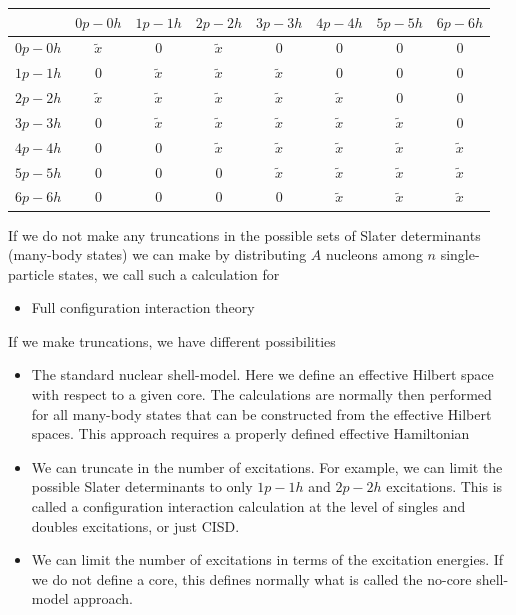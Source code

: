 \begin{table}
\begin{center}
\begin{tabular}{cccccccc}
\hline
\multicolumn{1}{c}{  } & \multicolumn{1}{c}{ $0p-0h$ } & \multicolumn{1}{c}{ $1p-1h$ } & \multicolumn{1}{c}{ $2p-2h$ } & \multicolumn{1}{c}{ $3p-3h$ } & \multicolumn{1}{c}{ $4p-4h$ } & \multicolumn{1}{c}{ $5p-5h$ } & \multicolumn{1}{c}{ $6p-6h$ } \\
\hline
$0p-0h$ & $\tilde{x}$ & 0           & $\tilde{x}$ & 0           & 0           & 0           & 0           \\
$1p-1h$ & 0           & $\tilde{x}$ & $\tilde{x}$ & $\tilde{x}$ & 0           & 0           & 0           \\
$2p-2h$ & $\tilde{x}$ & $\tilde{x}$ & $\tilde{x}$ & $\tilde{x}$ & $\tilde{x}$ & 0           & 0           \\
$3p-3h$ & 0           & $\tilde{x}$ & $\tilde{x}$ & $\tilde{x}$ & $\tilde{x}$ & $\tilde{x}$ & 0           \\
$4p-4h$ & 0           & 0           & $\tilde{x}$ & $\tilde{x}$ & $\tilde{x}$ & $\tilde{x}$ & $\tilde{x}$ \\
$5p-5h$ & 0           & 0           & 0           & $\tilde{x}$ & $\tilde{x}$ & $\tilde{x}$ & $\tilde{x}$ \\
$6p-6h$ & 0           & 0           & 0           & 0           & $\tilde{x}$ & $\tilde{x}$ & $\tilde{x}$ \\
\hline
\end{tabular}
\end{center}
\end{table}
If we do not make any truncations in the possible sets of Slater determinants (many-body states) we can make by distributing $A$ nucleons among $n$ single-particle states, we call such a calculation for 
\begin{itemize}
\item Full configuration interaction theory
\end{itemize}

\noindent
If we make truncations, we have different possibilities

\begin{itemize}
\item The standard nuclear shell-model. Here we define an effective Hilbert space with respect to a given core. The calculations are normally then performed for all many-body states that can be constructed from the effective Hilbert spaces. This approach requires a properly defined effective Hamiltonian

\item We can truncate in the number of excitations. For example, we can limit the possible Slater determinants to only $1p-1h$ and $2p-2h$ excitations. This is called a configuration interaction calculation at the level of singles and doubles excitations, or just CISD. 

\item We can limit the number of excitations in terms of the excitation energies. If we do not define a core, this defines normally what is called the no-core shell-model approach. 
\end{itemize}


